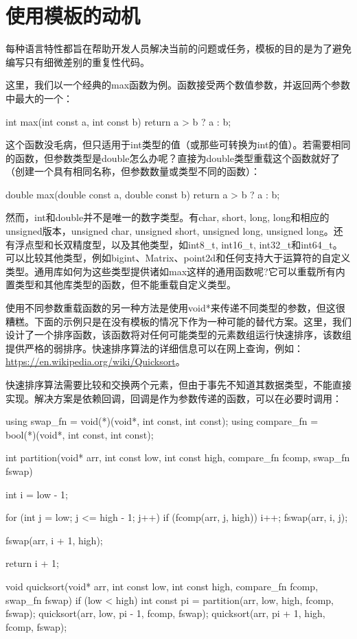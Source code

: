 \section{使用模板的动机}
每种语言特性都旨在帮助开发人员解决当前的问题或任务，模板的目的是为了避免编写只有细微差别的重复性代码。

这里，我们以一个经典的max函数为例。函数接受两个数值参数，并返回两个参数中最大的一个：

\begin{cpp}
int max(int const a, int const b)
{
	return a > b ? a : b;
}
\end{cpp}

这个函数没毛病，但只适用于int类型的值（或那些可转换为int的值）。若需要相同的函数，但参数类型是double怎么办呢？直接为double类型重载这个函数就好了（创建一个具有相同名称，但参数数量或类型不同的函数）：

\begin{cpp}
double max(double const a, double const b)
{
	return a > b ? a : b;
}
\end{cpp}

然而，int和double并不是唯一的数字类型。有char, short, long, long和相应的unsigned版本，unsigned char, unsigned short, unsigned long, unsigned long。还有浮点型和长双精度型，以及其他类型，如int8\_t, int16\_t, int32\_t和int64\_t。可以比较其他类型，例如bigint、Matrix、point2d和任何支持大于运算符的自定义类型。通用库如何为这些类型提供诸如max这样的通用函数呢?它可以重载所有内置类型和其他库类型的函数，但不能重载自定义类型。

使用不同参数重载函数的另一种方法是使用void*来传递不同类型的参数，但这很糟糕。下面的示例只是在没有模板的情况下作为一种可能的替代方案。这里，我们设计了一个排序函数，该函数将对任何可能类型的元素数组运行快速排序，该数组提供严格的弱排序。快速排序算法的详细信息可以在网上查询，例如：\url{https://en.wikipedia.org/wiki/Quicksort}。

快速排序算法需要比较和交换两个元素，但由于事先不知道其数据类型，不能直接实现。解决方案是依赖回调，回调是作为参数传递的函数，可以在必要时调用：

\begin{cpp}
using swap_fn = void(*)(void*, int const, int const);
using compare_fn = bool(*)(void*, int const, int const);

int partition(void* arr, int const low, int const high,
			  compare_fn fcomp, swap_fn fswap)
{
	int i = low - 1;
	
	for (int j = low; j <= high - 1; j++)
	{
		if (fcomp(arr, j, high))
		{
			i++;
			fswap(arr, i, j);
		}
	}

	fswap(arr, i + 1, high);
	
	return i + 1;
}

void quicksort(void* arr, int const low, int const high,
			   compare_fn fcomp, swap_fn fswap)
{
	if (low < high)
	{
		int const pi = partition(arr, low, high, fcomp,
			fswap);
		quicksort(arr, low, pi - 1, fcomp, fswap);
		quicksort(arr, pi + 1, high, fcomp, fswap);
	}
}
\end{cpp}

